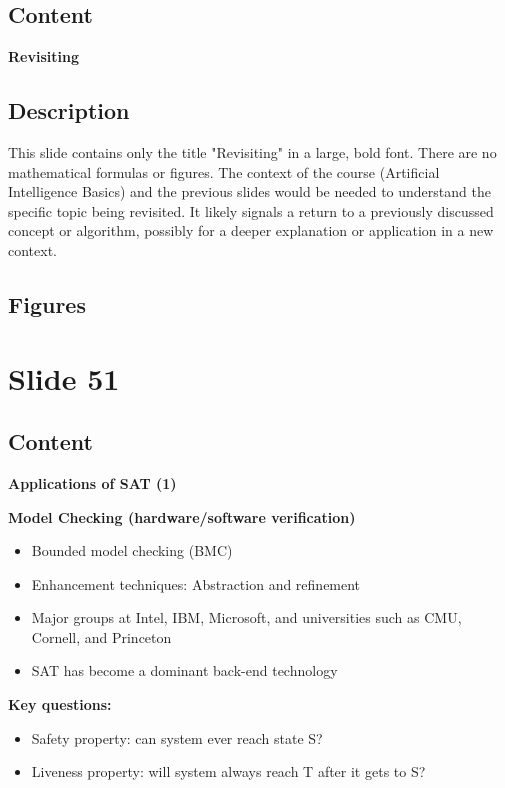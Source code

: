 \documentclass{article}%
\begin{document}
\subsection{Content}%

\textbf{Revisiting}
%
\subsection{Description}%
This slide contains only the title "Revisiting" in a large, bold font.  There are no mathematical formulas or figures.  The context of the course (Artificial Intelligence Basics) and the previous slides would be needed to understand the specific topic being revisited.  It likely signals a return to a previously discussed concept or algorithm, possibly for a deeper explanation or application in a new context.%
\subsection{Figures}%
\begin{figure}[H]%
\centering%
\end{figure}

%
\newpage%
\section{Slide 51}%
\label{sec:Slide51}%
\subsection{Content}%

\textbf{Applications of SAT (1)}

\textbf{Model Checking (hardware/software verification)}
\begin{itemize}
    \item Bounded model checking (BMC)
    \item Enhancement techniques: Abstraction and refinement
    \item Major groups at Intel, IBM, Microsoft, and universities such as CMU, Cornell, and Princeton
    \item SAT has become a dominant back-end technology
\end{itemize}

\textbf{Key questions:}
\begin{itemize}
    \item Safety property: can system ever reach state S?
    \item Liveness property: will system always reach T after it gets to S?
\end{itemize}
\end{document}
